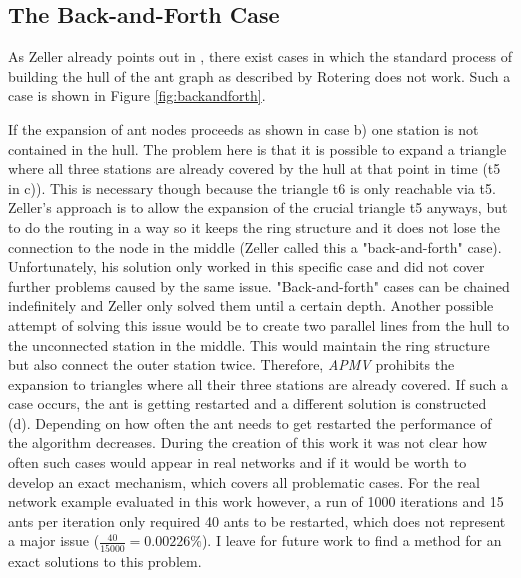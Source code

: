 \subsection{The Back-and-Forth Case}\label{backandforth}
As Zeller already points out in \cite{zeller2021planung}, there exist cases in which the standard process of building the hull  of the ant graph as described by Rotering does not work. Such a case is shown in Figure \ref{fig:backandforth}.

If the expansion of ant nodes proceeds as shown in case b) one station is not contained in the hull. The problem here is that it is possible to expand a triangle where all three stations are already covered by the hull at that point in time (t5 in c)). This is necessary though because the triangle t6 is only reachable via t5. Zeller's approach is to allow the expansion of the crucial triangle t5 anyways, but to do the routing in a way so it keeps the ring structure and it does not lose the connection to the node in the middle (Zeller called this a "back-and-forth" case). Unfortunately, his solution only worked in this specific case and did not cover further problems caused by the same issue. "Back-and-forth" cases can be chained indefinitely and Zeller only solved them until a certain depth. Another possible attempt of solving this issue would be to create two parallel lines from the hull to the unconnected station in the middle. This would maintain the ring structure but also connect the outer station twice. Therefore, \textit{APMV} prohibits the expansion to triangles where all their three stations are already covered. If such a case occurs, the ant is getting restarted and a different solution is constructed (d). Depending on how often the ant needs to get restarted the performance of the algorithm decreases. During the creation of this work it was not clear how often such cases would appear in real networks and if it would be worth to develop an exact mechanism, which covers all problematic cases. For the real network example evaluated in this work however, a run of 1000 iterations and 15 ants per iteration only required 40 ants to be restarted, which does not represent a major issue ($\frac{40}{15000} = 0.00226 \%$). I leave for future work to find a method for an exact solutions to this problem.

